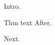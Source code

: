 \documentclass{article}\newtheorem{thm}{Theorem}
\begin{document}
Intro.

{\thm Thm text\let\endthm\relax} After.

Next.
\end{document}
